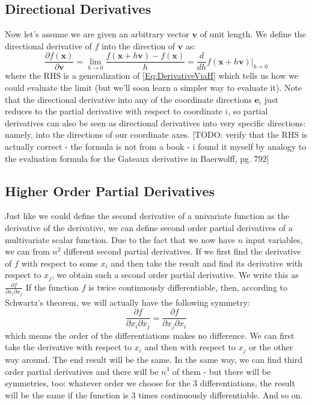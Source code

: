 \subsection{Directional Derivatives}
Now let's assume we are given an arbitrary vector $\mathbf{v}$ of unit length. We define the directional derivative of $f$ into the direction of  $\mathbf{v}$ as:
\begin{equation}
\label{Eq:DirectionalDerivative}
 \frac{\partial f(\mathbf{x}) }{\partial \mathbf{v}} 
 = \lim_{h \rightarrow 0} \frac{f(\mathbf{x} + h \mathbf{v} ) - f(\mathbf{x})}{h}
 = \frac{d}{d h} f(\mathbf{x} + h \mathbf{v}) \bigg\rvert_{h=0}
\end{equation}
where the RHS is a generalization of \ref{Eq:DerivativeViaH} which tells us how we could evaluate the limit (but we'll soon learn a simpler way to evaluate it). Note that the directional derivative into any of the coordinate directions $\mathbf{e}_i$ just reduces to the partial derivative with respect to coordinate $i$, so partial derivatives can also be seen as directional derivatives into very specific directions: namely, into the directions of our coordinate axes. [TODO: verify that the RHS is actually correct - the formula is not from a book - i found it myself by analogy to the evaluation formula for the Gateaux derivative in Baerwolff, pg. 792]

\subsection{Higher Order Partial Derivatives}
Just like we could define the second derivative of a univariate function as the derivative of the derivative, we can define second order partial derivatives of a multivariate scalar function. Due to the fact that we now have $n$ input variables, we can from $n^2$ different second partial derivatives. If we first find the derivative of $f$ with respect to some $x_i$ and then take the result and find its derivative with respect to $x_j$, we obtain such a second order partial derivative. We write this as $ \frac{\partial f}{\partial x_i \partial x_j}$ If the function $f$ is twice continuously differentiable, then, according to Schwartz's theorem, we will actually have the following symmetry:
\begin{equation}
	\frac{\partial f}{\partial x_i \partial x_j} 
	=
	\frac{\partial f}{\partial x_j \partial x_i} 
\end{equation}
which means the order of the differentiations makes no difference. We can first take the derivative with respect to $x_i$ and then with respect to $x_j$ or the other way around. The end result will be the same. In the same way, we can find third order partial derivatives and there will be $n^3$ of them - but there will be symmetries, too: whatever order we choose for the 3 differentiations, the result will be the same if the function is 3 times continuously differentiable. And so on.



